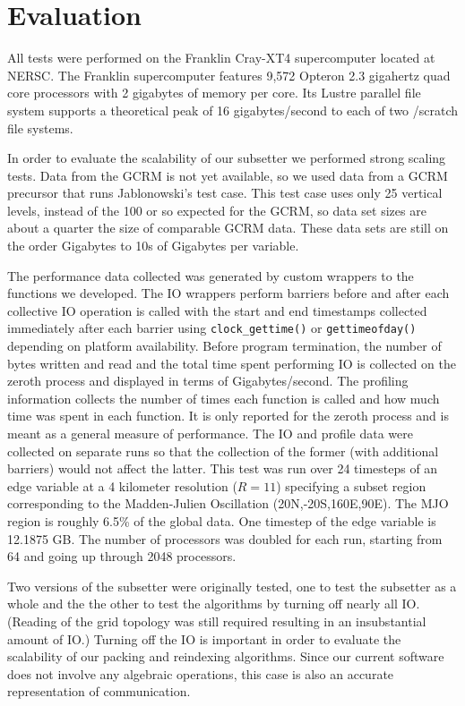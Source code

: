 \section{Evaluation}
\label{section:evaluation}

All tests were performed on the Franklin Cray-XT4 supercomputer\cite{franklin}
located at NERSC\cite{NERSC}.  The Franklin supercomputer features 9,572
Opteron 2.3 gigahertz quad core processors with 2 gigabytes of memory per
core.  Its Lustre parallel file system supports a theoretical peak of 16
gigabytes/second to each of two /scratch file systems.

In order to evaluate the scalability of our subsetter we performed strong
scaling tests. Data from the GCRM is not yet available, so we used data from a
GCRM precursor that runs Jablonowski's test case\cite{JAB}. This test case
uses only 25 vertical levels, instead of the 100 or so expected for the GCRM,
so data set sizes are about a quarter the size of comparable GCRM data. These
data sets are still on the order Gigabytes to 10s of Gigabytes per variable.

The performance data collected was generated by custom wrappers to the
functions we developed.  The IO wrappers perform barriers before and after
each collective IO operation is called with the start and end timestamps
collected immediately after each barrier using \verb=clock_gettime()= or
\verb=gettimeofday()= depending on platform availability.  Before program
termination, the number of bytes written and read and the total time spent
performing IO is collected on the zeroth process and displayed in terms of
Gigabytes/second.  The profiling information collects the number of times each
function is called and how much time was spent in each function.  It is only
reported for the zeroth process and is meant as a general measure of
performance.  The IO and profile data were collected on separate runs so that
the collection of the former (with additional barriers) would not affect the
latter.  This test was run over 24 timesteps of an edge variable at a 4
kilometer resolution ($R=11$) specifying a subset region corresponding to the
Madden-Julien Oscillation\cite{MJO} (20N,-20S,160E,90E).  The MJO region is
roughly 6.5\% of the global data.  One timestep of the edge variable is
12.1875 GB.  The number of processors was doubled for each run, starting from
64 and going up through 2048 processors.

Two versions of the subsetter were originally tested, one to test the
subsetter as a whole and the the other to test the algorithms by turning off
nearly all IO.  (Reading of the grid topology was still required resulting in
an insubstantial amount of IO.)  Turning off the IO is important in order to
evaluate the scalability of our packing and reindexing algorithms.  Since our
current software does not involve any algebraic operations, this case is also
an accurate representation of communication.

